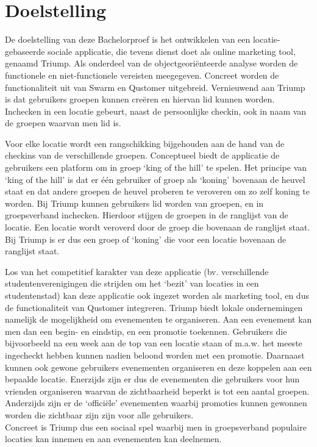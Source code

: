 
\chapter{Doelstelling}

De doelstelling van deze Bachelorproef is het ontwikkelen van een locatie-gebaseerde sociale applicatie, die tevens dienst doet als online marketing tool, genaamd Triump. Als onderdeel van de objectgeoriënteerde analyse worden de functionele en niet-functionele vereisten meegegeven.
Concreet worden de functionaliteit uit van Swarm en Qustomer uitgebreid. Vernieuwend aan Triump is dat gebruikers groepen kunnen creëren en hiervan lid kunnen worden. Inchecken in een locatie gebeurt, naast de persoonlijke checkin, ook in naam van de groepen waarvan men lid is.  


Voor elke locatie wordt een rangschikking bijgehouden aan de hand van de checkins van de verschillende groepen. Conceptueel biedt de applicatie de gebruikers een platform om in groep `king of the hill' te spelen. Het principe van `king of the hill' is dat er één gebruiker of groep als `koning' bovenaan de heuvel staat en dat andere groepen de heuvel proberen te veroveren om zo zelf koning te worden. Bij Triump kunnen gebruikers lid worden van groepen, en in groepsverband inchecken. Hierdoor stijgen de groepen in de ranglijst van de locatie. Een locatie wordt veroverd door de groep die bovenaan de ranglijst staat.
Bij Triump is er dus een groep of `koning' die voor een locatie bovenaan de ranglijst staat.

Los van het competitief karakter van deze applicatie (bv. verschillende studentenverenigingen die strijden om het ‘bezit’ van locaties in een studentenstad) kan deze applicatie ook ingezet worden als marketing tool, en dus de functionaliteit van Qustomer integreren.
Triump biedt lokale ondernemingen namelijk de mogelijkheid om evenementen te organiseren. Aan een evenement kan men dan een begin- en eindstip, en een promotie toekennen. Gebruikers die bijvoorbeeld na een week aan de top van een locatie staan of m.a.w. het meeste ingecheckt hebben kunnen nadien beloond worden met een promotie. Daarnaast kunnen ook gewone gebruikers evenementen organiseren en deze koppelen aan een bepaalde locatie.
Enerzijds zijn er dus de evenementen die gebruikers voor hun vrienden organiseren waarvan de zichtbaarheid beperkt is tot een aantal groepen. Anderzijds zijn er de `officiële' evenementen waarbij promoties kunnen gewonnen worden die zichtbaar zijn zijn voor alle gebruikers. 
\\Concreet is Triump dus een sociaal spel waarbij men in groepsverband populaire locaties kan innemen en aan evenementen kan deelnemen.

